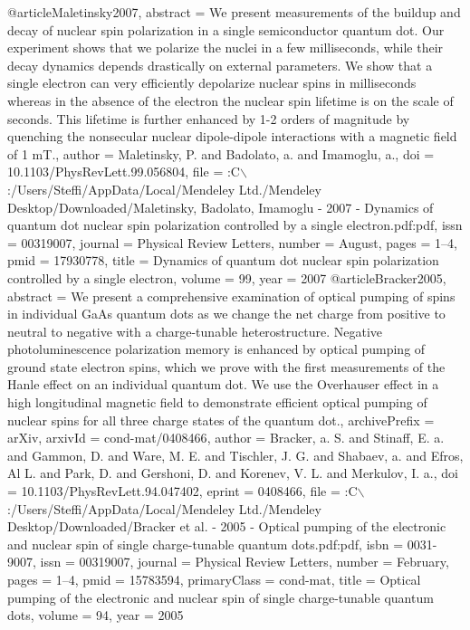 @article{Maletinsky2007,
abstract = {We present measurements of the buildup and decay of nuclear spin polarization in a single semiconductor quantum dot. Our experiment shows that we polarize the nuclei in a few milliseconds, while their decay dynamics depends drastically on external parameters. We show that a single electron can very efficiently depolarize nuclear spins in milliseconds whereas in the absence of the electron the nuclear spin lifetime is on the scale of seconds. This lifetime is further enhanced by 1-2 orders of magnitude by quenching the nonsecular nuclear dipole-dipole interactions with a magnetic field of 1 mT.},
author = {Maletinsky, P. and Badolato, a. and Imamoglu, a.},
doi = {10.1103/PhysRevLett.99.056804},
file = {:C$\backslash$:/Users/Steffi/AppData/Local/Mendeley Ltd./Mendeley Desktop/Downloaded/Maletinsky, Badolato, Imamoglu - 2007 - Dynamics of quantum dot nuclear spin polarization controlled by a single electron.pdf:pdf},
issn = {00319007},
journal = {Physical Review Letters},
number = {August},
pages = {1--4},
pmid = {17930778},
title = {{Dynamics of quantum dot nuclear spin polarization controlled by a single electron}},
volume = {99},
year = {2007}
}
@article{Bracker2005,
abstract = {We present a comprehensive examination of optical pumping of spins in individual GaAs quantum dots as we change the net charge from positive to neutral to negative with a charge-tunable heterostructure. Negative photoluminescence polarization memory is enhanced by optical pumping of ground state electron spins, which we prove with the first measurements of the Hanle effect on an individual quantum dot. We use the Overhauser effect in a high longitudinal magnetic field to demonstrate efficient optical pumping of nuclear spins for all three charge states of the quantum dot.},
archivePrefix = {arXiv},
arxivId = {cond-mat/0408466},
author = {Bracker, a. S. and Stinaff, E. a. and Gammon, D. and Ware, M. E. and Tischler, J. G. and Shabaev, a. and Efros, Al L. and Park, D. and Gershoni, D. and Korenev, V. L. and Merkulov, I. a.},
doi = {10.1103/PhysRevLett.94.047402},
eprint = {0408466},
file = {:C$\backslash$:/Users/Steffi/AppData/Local/Mendeley Ltd./Mendeley Desktop/Downloaded/Bracker et al. - 2005 - Optical pumping of the electronic and nuclear spin of single charge-tunable quantum dots.pdf:pdf},
isbn = {0031-9007},
issn = {00319007},
journal = {Physical Review Letters},
number = {February},
pages = {1--4},
pmid = {15783594},
primaryClass = {cond-mat},
title = {{Optical pumping of the electronic and nuclear spin of single charge-tunable quantum dots}},
volume = {94},
year = {2005}
}
